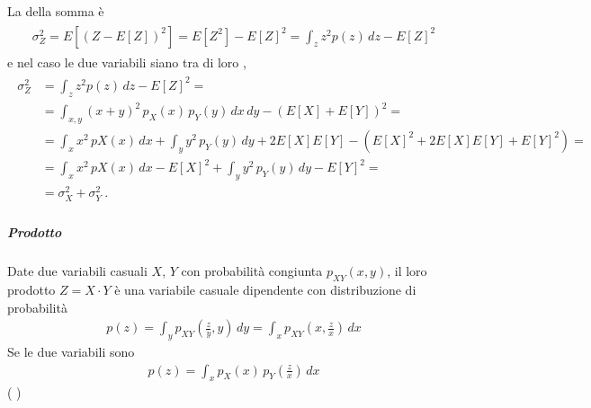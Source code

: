 \documentclass[letterpaper,10pt,italian]{jupyterBook}
\begin{document}
\sphinxAtStartPar
La  della somma è
\begin{equation*}
\begin{split}\begin{aligned}
  \sigma_Z^2 = E\left[(Z - E[Z])^2\right] 
  = E\left[Z^2\right] - E[Z]^2
  = \int_z z^2 p(z) \, dz - E[Z]^2
\end{aligned}\end{split}
\end{equation*}
\sphinxAtStartPar
e nel caso le due variabili siano tra di loro ,
\begin{equation*}
\begin{split}\begin{aligned}
  \sigma_Z^2 
  & = \int_z z^2 p(z) \, dz - E[Z]^2 = \\
  & = \int_{x,y} (x+y)^2 \, p_{X}(x) \, p_{Y}(y) \, dx \, dy - \left(E[X] + E[Y]\right)^2 = \\
  & = \int_{x} x^2 \, p{X}(x) \, dx + \int_{y} y^2 \, p_Y(y) \, dy + 2 E[X] E[Y] - \left( E[X]^2 + 2 E[X] E[Y] + E[Y]^2 \right) = \\
  & = \int_{x} x^2 \, p{X}(x) \, dx - E[X]^2 + \int_{y} y^2 \, p_Y(y) \, dy - E[Y]^2 = \\
  & = \sigma_X^2 + \sigma_Y^2 \ .
\end{aligned}\end{split}
\end{equation*}

\subparagraph{Prodotto}
\label{\detokenize{ch/statistics/rv_pdf_transformations:prodotto}}
\sphinxAtStartPar
Date due variabili casuali \(X\), \(Y\) con probabilità congiunta \(p_{XY}(x,y)\), il loro prodotto \(Z = X \cdot Y\) è una variabile casuale dipendente con distribuzione di probabilità
\begin{equation*}
\begin{split}p(z) = \int_{y} p_{XY} \left(\frac{z}{y}, y \right) \, dy = \int_{x} p_{XY} \left(x, \frac{z}{x} \right) \, dx\end{split}
\end{equation*}
\sphinxAtStartPar
Se le due variabili sono 
\begin{equation*}
\begin{split}p(z) = \int_x p_X(x) \, p_Y\left( \frac{z}{x} \right) \, dx\end{split}
\end{equation*}
\sphinxAtStartPar
( )
\end{document}
